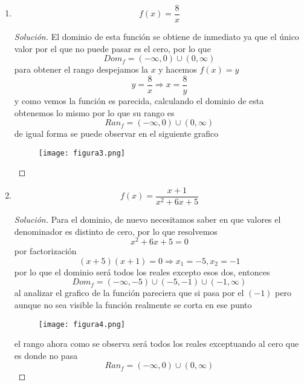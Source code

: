 \documentclass[12pt]{article}
\newenvironment{solution}{\begin{proof}[Solución]}{\end{proof}}
\begin{document}
\begin{enumerate}
\begin{solution}
    \end{solution}
    \item \[f(x) = \frac{8}{x}\]\begin{solution}
        El dominio de esta función se obtiene de inmediato ya que el único valor por el que no puede pasar es el cero, por lo que
        \[Dom_f = (-\infty,0) \cup (0, \infty)\]
        para obtener el rango despejamos la $x$ y hacemos $f(x) = y$
        \[y = \frac{8}{x} \Rightarrow x = \frac{8}{y}\]
        y como vemos la función es parecida, calculando el dominio de esta obtenemos lo mismo por lo que su rango es
        \[Ran_f = (-\infty,0) \cup (0, \infty)\]
        de igual forma se puede observar en el siguiente grafico
        \begin{figure}[H]
            \centering
            \texttt{[image: figura3.png]}
        \end{figure}
    \end{solution}
    \item \[f(x) = \frac{x+1}{x^2+6x+5}\]\begin{solution}
        Para el dominio, de nuevo necesitamos saber en que valores el denominador es distinto de cero, por lo que resolvemos
        \[x^2+6x +5 = 0\] por factorización \[(x+5)(x+1) = 0 \Rightarrow x_1 = -5, x_2 = -1\]
        por lo que el dominio será todos los reales excepto esos dos, entonces
        \[Dom_f = (-\infty, -5) \cup (-5,-1) \cup (-1, \infty)\]
        al analizar el grafico de la función pareciera que si pasa por el $(-1)$ pero aunque no sea visible la función realmente se corta en ese punto
        \begin{figure}[H]
            \centering
            \texttt{[image: figura4.png]}
        \end{figure}
        el rango ahora como se observa será todos los reales exceptuando al cero que es donde no pasa
        \[Ran_f = (-\infty, 0) \cup (0, \infty)\]
    \end{solution}
\end{enumerate}

\end{document}
